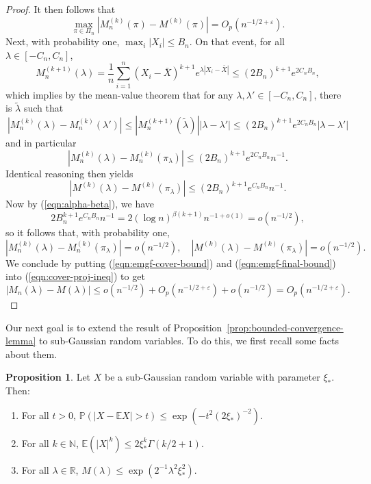\documentclass{article}
\theoremstyle{definition}
\newtheorem{proposition}{Proposition}
\newcommand*\eps{\epsilon}
\renewcommand*\epsilon{\varepsilon}
\newcommand{\R}{\mathbb{R}}
\newcommand{\N}{\mathbb{N}}
\newcommand{\E}{\mathbb{E}}
\newcommand{\1}{\mathbbm{1}}
\renewcommand{\P}{\mathbb{P}}
\begin{document}
\begin{proof}
   It then follows that
    \begin{equation}
        \max_{\pi \in \Pi_n} |M_n^{(k)}(\pi) - M^{(k)}(\pi)| = O_p(n^{-1/2 + \eps}).
        \label{eqn:emgf-cover-bound}
    \end{equation}
    Next, with probability one, $\max_i |X_i| \leq B_n$. On that event, for all $\lambda \in [-C_n, C_n]$,
    \[
    M_n^{(k+1)}(\lambda) = \frac1n\sum_{i=1}^n(X_i - \bar X)^{k+1}e^{\lambda |X_i - \bar X|} \leq (2B_n)^{k+1}e^{2C_nB_n},
    \]
    which implies by the mean-value theorem that for any $\lambda, \lambda' \in [-C_n, C_n]$, there is $\tilde \lambda$ such that 
    \[
    |M_n^{(k)}(\lambda) - M_n^{(k)}(\lambda')| \leq |M_{n}^{(k+1)}(\tilde \lambda)||\lambda - \lambda'| \leq (2B_n)^{k+1}e^{2C_nB_n}|\lambda - \lambda'|
    \]
    and in particular 
    \begin{equation}
        |M_n^{(k)}(\lambda) - M^{(k)}_n(\pi_\lambda)| \leq (2B_n)^{k+1}e^{2C_nB_n}n^{-1}.\label{eqn:emgf-lipschitz}
    \end{equation}
    Identical reasoning then yields
    \begin{equation}
        |M^{(k)}(\lambda) - M^{(k)}(\pi_\lambda)| \leq (2B_n)^{k+1}e^{C_nB_n}n^{-1}.\label{eqn:mgf-lipschitz}
    \end{equation}
    Now by (\ref{eqn:alpha-beta}), we have 
    \[
    2B_n^{k+1}e^{C_nB_n}n^{-1} = 2(\log n)^{\beta(k+1)} n^{-1+o(1)} = o(n^{-1/2}),
    \]
    so it follows that, with probability one,
    \begin{equation}
        |M_n^{(k)}(\lambda) - M^{(k)}_n(\pi_\lambda)| = o(n^{-1/2}), \quad |M^{(k)}(\lambda) - M^{(k)}(\pi_\lambda)| = o(n^{-1/2}).
        \label{eqn:emgf-final-bound}
    \end{equation}
    We conclude by putting (\ref{eqn:emgf-cover-bound}) and (\ref{eqn:emgf-final-bound}) into (\ref{eqn:cover-proj-ineq}) to get 
    \[
    |M_n(\lambda) - M(\lambda)| \leq o(n^{-1/2}) + O_p(n^{-1/2 + \eps}) + o(n^{-1/2}) = O_p(n^{-1/2 + \eps}).
    \]
\end{proof}
Our next goal is to extend the result of Proposition~\ref{prop:bounded-convergence-lemma} to sub-Gaussian random variables. To do this, we first recall some facts about them.
\begin{proposition}
\label{prop:sub-Gaussian-props}
    Let $X$ be a sub-Gaussian random variable with parameter $\xi_*$. Then: 
    \begin{enumerate}
        \item[(a)] For all $t > 0$, $\P(|X - \E X| > t) \leq \exp\left(-t^2(2\xi_*)^{-2}\right).$
        \item[(b)] For all $k \in\N$, $\E(|X|^{k}) \leq 2\xi_*^k\Gamma(k/2 + 1)$.
        \item[(c)] For all $\lambda \in \R$, $M(\lambda) \leq \exp(2^{-1}\lambda^2\xi_*^2)$.
    \end{enumerate}
\end{proposition}
\end{document}
